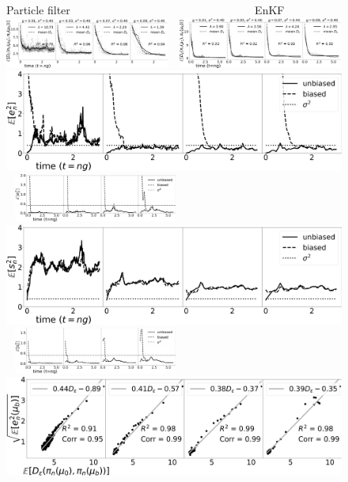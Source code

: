 \begin{figure}[t!]
\centering
Particle filter $\qquad \qquad \qquad \qquad \qquad \qquad \qquad \qquad $ EnKF\\
    \includegraphics[width=0.48\textwidth]{stability/plots/plots-bpf-effect of obs gap-rate_obs_gap_all.jpg} $\ \ $
    \includegraphics[width=0.48\textwidth]{stability/plots/plots-enkf-effect of ob gap-rate_all.jpg}\\
   \includegraphics[width=0.48\columnwidth]{stability/plots/plots-bpf-effect of obs gap-l2_obs_gap_all.jpg} $\ \ $
    \includegraphics[width=0.48\textwidth]{stability/plots/plots-enkf-effect of ob gap-mean_l2error_all.jpg}\\
   \includegraphics[width=0.48\columnwidth]{stability/plots/plots-bpf-effect of obs gap-trace_obs_gap_all.jpg} $\ \ $
    \includegraphics[width=0.48\textwidth]{stability/plots/plots-enkf-effect of ob gap-mean_trace_all.jpg}\\
   \includegraphics[width=0.48\columnwidth]{stability/plots/plots-bpf-effect of obs gap-dvl2_obs_gap_all.jpg} $\ \ $

\end{figure}
